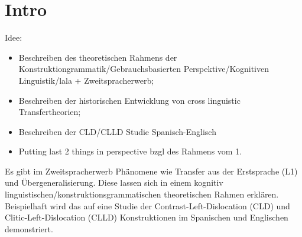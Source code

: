 \section{Intro}

\begin{comment}
* ca 3/4 Seiten
* Untersuchungsgegenstand
* Erkenntnisinteresse
* Forschungsstand
* Vorgehensweise
* Ergebnisse können/sollen angedeuten werden
\end{comment}

Idee:
\begin{itemize}
    \item Beschreiben des theoretischen Rahmens der Konstruktiongrammatik/Gebrauchsbasierten Perspektive/Kognitiven Linguistik/lala + Zweitspracherwerb;
    \item Beschreiben der historischen Entwicklung von cross linguistic Transfertheorien;
    \item Beschreiben der CLD/CLLD Studie Spanisch-Englisch
    \item Putting last 2 things in perspective bzgl des Rahmens vom 1.
\end{itemize}

Es gibt im Zweitspracherwerb Phänomene wie Transfer aus der Erstsprache (L1) und Übergeneralisierung.
Diese lassen sich in einem kognitiv linguistischen/konstruktionsgrammatischen theoretischen Rahmen erklären.
Beispielhaft wird das auf eine Studie der Contrast-Left-Dislocation (CLD) und Clitic-Left-Dislocation (CLLD) Konstruktionen im Spanischen und Englischen demonstriert.
